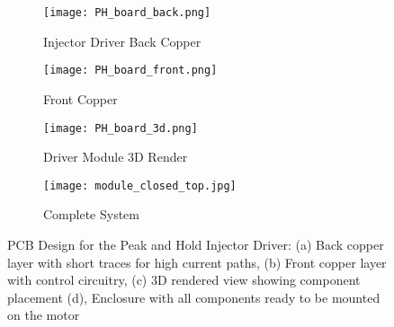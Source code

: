         \begin{figure}[H]
            \centering
            \begin{subfigure}{0.4\textwidth}
                \centering
                \texttt{[image: PH\_board\_back.png]}
                \caption{Injector Driver Back Copper}
                \label{fig:pcb_back}
            \end{subfigure}
            \hfill
            \begin{subfigure}{0.4\textwidth}
                \centering
                \texttt{[image: PH\_board\_front.png]}
                \caption{Front Copper}
                \label{fig:pcb_front}
            \end{subfigure}
            \hfill
            \begin{subfigure}{0.37\textwidth}
                \centering
                \texttt{[image: PH\_board\_3d.png]}
                \caption{Driver Module 3D Render}
                \label{fig:pcb_3d}
            \end{subfigure}
            \hfill
             \begin{subfigure}{0.4\textwidth}
                \centering
                \texttt{[image: module\_closed\_top.jpg]}
                \caption{Complete System}
                \label{fig:module_ready}
            \end{subfigure}
            \caption{PCB Design for the Peak and Hold Injector Driver: (a) Back copper layer with short traces for high current paths, (b) Front copper layer with control circuitry, (c) 3D rendered view showing component placement (d), Enclosure with all components ready to be mounted on the motor}
            \label{fig:pcb_design}
        \end{figure}






